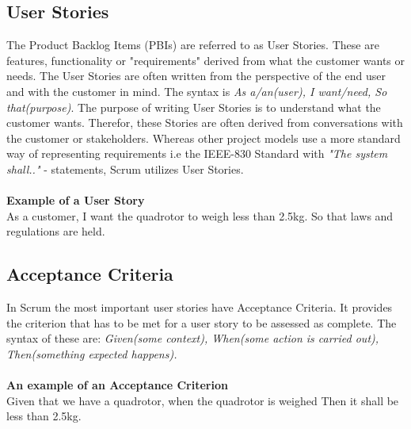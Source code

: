 \subsection{User Stories}
The Product Backlog Items (PBIs) are referred to as User Stories. These are features, functionality or "requirements" derived from what the customer wants or needs. The User Stories are often written from the perspective of the end user and with the customer in mind. The syntax is \textit{As a/an(user), I want/need, So that(purpose)}. The purpose of writing User Stories is to understand what the customer wants. Therefor, these Stories are often derived from conversations with the customer or stakeholders. Whereas other project models use a more standard way of representing requirements i.e the IEEE-830 Standard with \textit{"The system shall.."} - statements, Scrum utilizes User Stories. 
\\ \\
\textbf{Example of a User Story} \\
As a customer, I want the quadrotor to weigh less than 2.5kg. So that laws and regulations are held. 

\subsection{Acceptance Criteria}
In Scrum the most important user stories have Acceptance Criteria. It provides the criterion that has to be met for a user story to be assessed as complete.  
The syntax of these are: \textit{Given(some context), When(some action is carried out), Then(something expected happens).} \\
\\ 
\textbf{An example of an Acceptance Criterion} \\
Given that we have a quadrotor, when the quadrotor is weighed Then it shall be less than 2.5kg.




 